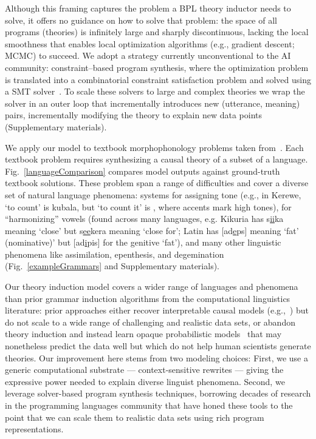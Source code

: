 \documentclass[12pt]{article}
\begin{document}
Although this framing captures the problem a BPL theory inductor needs to solve,
it offers no guidance on how to solve that problem:
the space of all programs (theories) is infinitely large and
sharply discontinuous, lacking the local smoothness that
enables local optimization algorithms (e.g., gradient descent; MCMC)
to succeed.
We adopt a strategy currently unconventional to the
AI community: constraint--based program synthesis,
where the optimization problem is translated
into a combinatorial constraint satisfaction 
problem and solved using
a SMT solver~\cite{solar2006combinatorial}.
To scale these solvers to
large and complex theories 
we wrap the solver in
an outer loop that incrementally
introduces new (utterance, meaning) pairs,
incrementally modifying the theory to explain
new data points (Supplementary materials).

We apply our model to textbook morphophonology problems taken from~\cite{9780511808869}.
Each textbook problem requires synthesizing a
causal theory of a subset of a language.
Fig.~\ref{languageComparison}
compares model outputs against 
ground-truth textbook solutions.
These problem span a range of difficulties
and cover a diverse set of natural language phenomena:
systems for assigning tone (e.g., in Kerewe,
`to count' is kubala, but `to count it' is , where accents mark high tones),
for ``harmonizing'' vowels (found across many languages, e.g. Kikuria
has s\underline{ii}ka meaning `close' but s\underline{ee}kera meaning `close for';
Latin has [ad\underline{e}ps] meaning `fat' (nominative)' but [ad\underline{i}pis] for the genitive `fat'),
and many other linguistic phenomena like
assimilation, epenthesis, and degemination (Fig.~\ref{exampleGrammars} and Supplementary materials).

Our theory induction model covers a wider range of languages and
phenomena than prior grammar induction algorithms from the
computational linguistics literature: prior approaches either recover
interpretable causal models
(e.g.,~\cite{Albright03rulesvs,gildea1996learning,rasin2015learning})
but do not scale to a wide range of challenging and realistic data
sets, or abandon theory induction and instead learn opaque
probabilistic models~\cite{cotterell-peng-eisner-2015} that may
nonetheless predict the data well but which do not help human
scientists generate theories.  Our improvement here stems from two
modeling choices: First, we use a generic computational substrate ---
context-sensitive rewrites --- giving the expressive power needed to
explain diverse linguist phenomena.  Second, we leverage solver-based
program synthesis techniques, borrowing decades of
research in the programming languages community that have honed these
tools to the point that we can scale them to
realistic data sets using rich program representations.
\end{document}
